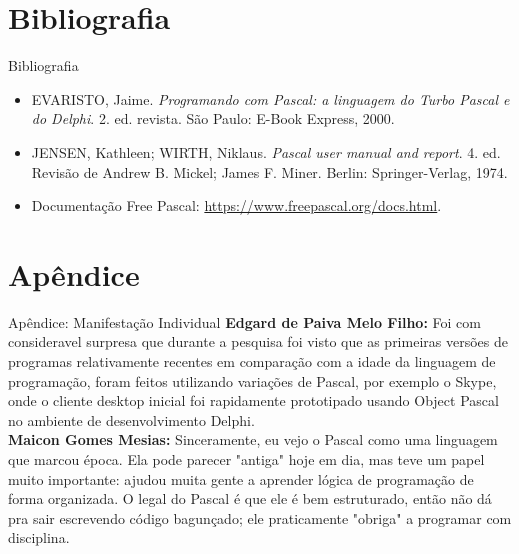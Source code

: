 \documentclass{beamer}
\begin{document}
\section{Bibliografia}
\begin{frame}{Bibliografia}
\begin{itemize}
\item EVARISTO, Jaime. \textit{Programando com Pascal: a linguagem do Turbo Pascal e do Delphi}. 2. ed. revista. São Paulo: E-Book Express, 2000.
\item JENSEN, Kathleen; WIRTH, Niklaus. \textit{Pascal user manual and report}. 4. ed. Revisão de Andrew B. Mickel; James F. Miner. Berlin: Springer-Verlag, 1974.
\item Documentação Free Pascal: \url{https://www.freepascal.org/docs.html}.
\end{itemize}
\end{frame}
\section{Apêndice}
\begin{frame}{Apêndice: Manifestação Individual}
\textbf{Edgard de Paiva Melo Filho:} Foi com consideravel surpresa que durante a pesquisa foi visto que as primeiras versões de programas relativamente recentes em comparação com a idade da linguagem de programação, foram feitos utilizando variações de Pascal, por exemplo o Skype, onde o cliente desktop inicial foi rapidamente prototipado usando Object Pascal no ambiente de desenvolvimento Delphi.
\\
\textbf{Maicon Gomes Mesias:} Sinceramente, eu vejo o Pascal como uma linguagem que marcou época. Ela pode parecer "antiga" hoje em dia, mas teve um papel muito importante: ajudou muita gente a aprender lógica de programação de forma organizada. O legal do Pascal é que ele é bem estruturado, então não dá pra sair escrevendo código bagunçado; ele praticamente "obriga" a programar com disciplina.
\end{frame}
\end{document}
